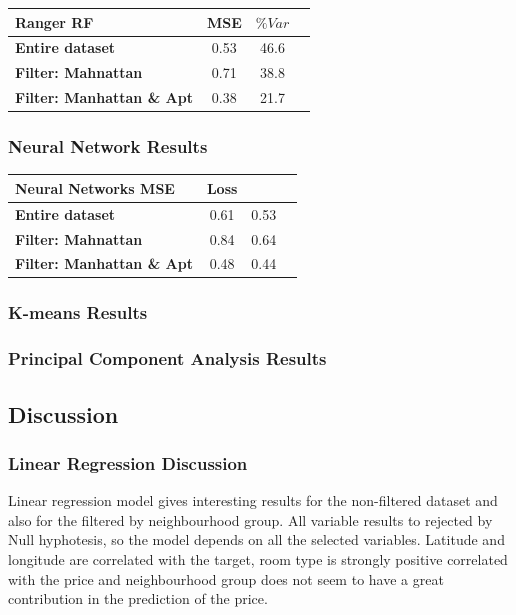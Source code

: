 \documentclass{FR16}
\begin{document}
\begin{center}
\begin{tabular}{l c c c }
\arrayrulecolor{Azzurro}
\hline
{\bfseries Ranger RF
} & MSE & $\% Var $ \\
\hline
{\bfseries Entire dataset}& 0.53 & 46.6 \\
{\bfseries Filter: Mahnattan} & 0.71 &  38.8  \\
{\bfseries Filter: Manhattan \& Apt}& 0.38 & 21.7   \\
\hline
\end{tabular}
\end{center}



\subsubsection{Neural Network Results}


\begin{center}
\begin{tabular}{l c c c }
\arrayrulecolor{Azzurro}
\hline
{\bfseries  Neural Networks
} MSE & Loss \\
\hline
{\bfseries Entire dataset} & 0.61 &  0.53 \\
{\bfseries Filter: Mahnattan} & 0.84  & 0.64 \\
{\bfseries Filter: Manhattan \& Apt} & 0.48 & 0.44  \\
\hline
\end{tabular}
\end{center}

\subsubsection{K-means Results}


\subsubsection{Principal Component Analysis Results}

\newpage
\subsection{Discussion}

\subsubsection{Linear Regression Discussion}
Linear regression model gives interesting results for the non-filtered dataset and also for the filtered by neighbourhood group.
All variable results to rejected by Null hyphotesis, so the model depends on all the selected variables.
Latitude and longitude are correlated with the target, room type is strongly positive correlated with the price and neighbourhood group does not seem to have
a great contribution in the prediction of the price.
\\
\end{document}
